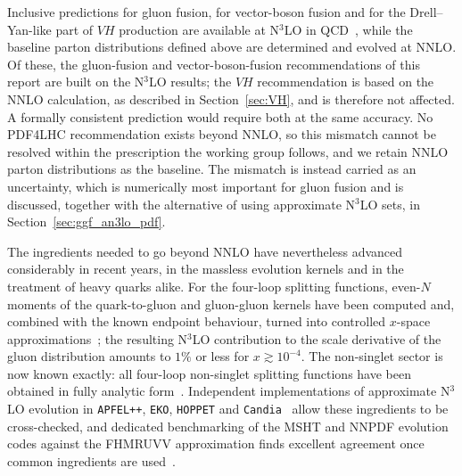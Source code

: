 Inclusive predictions for gluon fusion, for vector-boson fusion and for the
Drell--Yan-like part of $VH$ production are available at N$^3$LO in
QCD~\cite{Mistlberger:2018etf,Dreyer:2016oyx,Baglio:2022wzu}, while the
baseline parton distributions defined above are determined and evolved at NNLO.
Of these, the gluon-fusion and vector-boson-fusion recommendations of this
report are built on the N$^3$LO results; the $VH$ recommendation is based on
the NNLO calculation, as described in Section~\ref{sec:VH}, and is therefore
not affected.
A formally consistent prediction would require both at the same accuracy. No
PDF4LHC recommendation exists beyond NNLO, so this mismatch cannot be resolved
within the prescription the working group follows, and we retain NNLO parton
distributions as the baseline. The mismatch is instead carried as an
uncertainty, which is numerically most important for gluon fusion and is
discussed, together with the alternative of using approximate N$^3$LO sets, in
Section~\ref{sec:ggf_an3lo_pdf}.

The ingredients needed to go beyond NNLO have nevertheless advanced
considerably in recent years, in the massless evolution kernels and in the
treatment of heavy quarks alike. For the four-loop splitting functions, even-$N$
moments of the quark-to-gluon and gluon-gluon kernels have been computed and,
combined with the known endpoint behaviour, turned into controlled $x$-space
approximations~\cite{Falcioni:2024xyt,Falcioni:2024qpd}; the resulting N$^3$LO
contribution to the scale derivative of the gluon distribution amounts to $1\%$
or less for $x\gtrsim10^{-4}$. The non-singlet sector is now known exactly: all
four-loop non-singlet splitting functions have been obtained in fully analytic
form~\cite{Gehrmann:2026qbl}. Independent implementations of approximate
N$^3$LO evolution in \texttt{APFEL++}, \texttt{EKO}, \texttt{HOPPET} and
\texttt{Candia}~\cite{Bertone:2017gds,Candido:2022tld,Karlberg:2025hxk,Hampson:2025pvi}
allow these ingredients to be cross-checked, and dedicated benchmarking of the
MSHT and NNPDF evolution codes against the FHMRUVV approximation finds
excellent agreement once common ingredients are
used~\cite{Cooper-Sarkar:2024crx,Bertone:2024dpm}.

